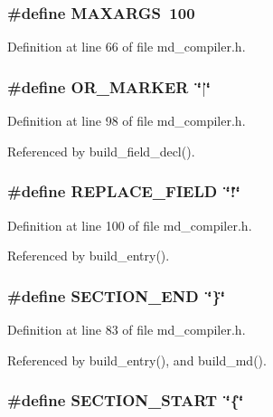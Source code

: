 \subsubsection{\setlength{\rightskip}{0pt plus 5cm}\#define \bf{MAXARGS}~100}\label{md__compiler_8h_41101847771d39a4f0a7f9395061c629}




Definition at line 66 of file md\_\-compiler.h.
\subsubsection{\setlength{\rightskip}{0pt plus 5cm}\#define OR\_\-MARKER~\char`\"{}$|$\char`\"{}}\label{md__compiler_8h_a174135ccbe6da5bc1a46fd65f48e3d1}




Definition at line 98 of file md\_\-compiler.h.

Referenced by build\_\-field\_\-decl().
\subsubsection{\setlength{\rightskip}{0pt plus 5cm}\#define REPLACE\_\-FIELD~\char`\"{}!\char`\"{}}\label{md__compiler_8h_3cb7b88246cabacf6a03c9a5c76f8c90}




Definition at line 100 of file md\_\-compiler.h.

Referenced by build\_\-entry().
\subsubsection{\setlength{\rightskip}{0pt plus 5cm}\#define SECTION\_\-END~\char`\"{}\}\char`\"{}}\label{md__compiler_8h_d5aae763518d851c59598275848e999a}




Definition at line 83 of file md\_\-compiler.h.

Referenced by build\_\-entry(), and build\_\-md().
\subsubsection{\setlength{\rightskip}{0pt plus 5cm}\#define SECTION\_\-START~\char`\"{}\{\char`\"{}}\label{md__compiler_8h_62f1bc5976cd195e942d569ea9bcb5ec}




